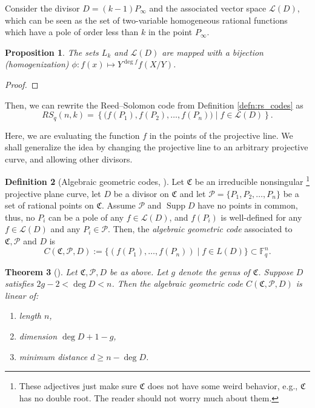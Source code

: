 \documentclass[11pt, oneside]{amsart}
\newtheorem{thm}{Theorem}[section]
\newtheorem{prop}[thm]{Proposition}
\theoremstyle{definition}
\newtheorem{defn}[thm]{Definition}
\theoremstyle{remark}
\numberwithin{equation}{section}
\DeclareMathOperator{\Supp}{Supp}
\begin{document}
Consider the divisor $D = (k-1)P_\infty$ and the associated vector space $\mathcal L(D)$, which can be seen as the set of two-variable homogeneous rational functions which have a pole of order less than $k$ in the point $P_\infty$.

\begin{prop}
	The sets $L_k$ and $\mathcal L(D)$ are mapped with a bijection (homogenization) $\phi: f(x) \mapsto Y^{\deg f} f(X/Y)$.
\end{prop}
\begin{proof}
\end{proof}

Then, we can rewrite the Reed--Solomon code from Definition \ref{defn:rs_codes} as
\begin{equation}
	RS_q(n, k) = \left\{\big(f(P_1), f(P_2), \dots, f(P_n)\big) \mid f \in \mathcal L(D)\right\}.
\end{equation}

Here, we are evaluating the function $f$ in the points of the projective line.
We shall generalize the idea by changing the projective line to an arbitrary projective curve, and allowing other divisors.

\begin{defn}[Algebraic geometric codes, \cite{LS87, Wal00}] %
	Let $\mathfrak C$ be an irreducible nonsingular%
	\footnote{These adjectives just make sure $\mathfrak C$ does not have some weird behavior, e.g., $\mathfrak C$ has no double root. The reader should not worry much about them.}
	projective plane curve, let $D$ be a divisor on $\mathfrak C$ and let $\mathcal P = \{P_1, P_2, \dots, P_n\}$ be a set of rational points on $\mathfrak C$.
	Assume $\mathcal P$ and $\Supp D$ have no points in common, thus, no $P_i$ can be a pole of any $f \in \mathcal L(D)$, and $f(P_i)$ is well-defined for any $f \in \mathcal L(D)$ and any $P_i \in \mathcal P$.
	Then, the \emph{algebraic geometric code} associated to $\mathfrak C, \mathcal P$ and $D$ is
	\begin{equation}
		C(\mathfrak C, \mathcal P, D) := \{(f(P_1), \dots, f(P_n)) \mid f \in L(D)\} \subset \mathbb{F}_q^n.
	\end{equation}
\end{defn}

\begin{thm}[\cite{Wal00}]
	Let $\mathfrak C, \mathcal P, D$ be as above. Let $g$ denote the genus of $\mathfrak C$. Suppose $D$ satisfies $2g - 2 < \deg D < n$. Then the algebraic geometric code $C(\mathfrak C, \mathcal P, D)$ is linear of:
	\begin{enumerate}[label = \textbullet, itemsep = 0pt]
		\item length $n$,
		\item dimension $\deg D + 1 - g$,
		\item minimum distance $d \ge n - \deg D$.
	\end{enumerate}
\end{thm}
\end{document}
